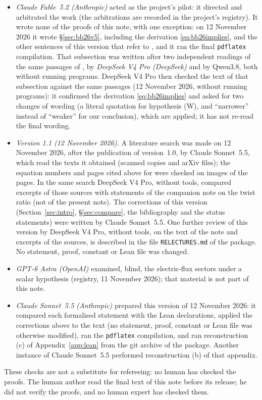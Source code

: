 \documentclass[11pt,a4paper]{article}
\theoremstyle{plain}
\theoremstyle{definition}
\theoremstyle{remark}
\numberwithin{equation}{section}
\begin{document}
\begin{itemize}
\item \emph{Claude Fable~5.2 (Anthropic)} acted as the project's pilot: it directed and arbitrated the work (the arbitrations are recorded in the project's registry). It wrote none of the proofs of this note, with one exception: on 12 November 2026 it wrote \S\ref{sec:bb26v5}, including the derivation \eqref{eq:bb26implies}, and the other sentences of this version that refer to \cite{BB26v5}, and it ran the final \texttt{pdflatex} compilation. That subsection was written after two independent readings of the same passages of \cite{BB26v5}, by \emph{DeepSeek V4 Pro (DeepSeek)} and by Qwen3.8, both without running programs. DeepSeek V4 Pro then checked the text of that subsection against the same passages (12 November 2026, without running programs): it confirmed the derivation \eqref{eq:bb26implies} and asked for two changes of wording (a literal quotation for hypothesis (W), and ``narrower'' instead of ``weaker'' for our conclusion), which are applied; it has not re-read the final wording.
\item \emph{Version 1.1 (12 November 2026).} A literature search was made on 12 November 2026, after the publication of version~1.0, by Claude Sonnet~5.5, which read the texts it obtained (scanned copies and arXiv files); the equation numbers and pages cited above for \cite{TY85,KT02,Kan} were checked on images of the pages. In the same search DeepSeek V4 Pro, without tools, compared excerpts of those sources with statements of the companion note on the twist ratio (not of the present note). The corrections of this version (Section~\ref{sec:intro}, \S\ref{sec:compare}, the bibliography and the status statements) were written by Claude Sonnet~5.5. One further review of this version by DeepSeek V4 Pro, without tools, on the text of the note and excerpts of the sources, is described in the file \texttt{RELECTURES.md} of the package. No statement, proof, constant or Lean file was changed.
\item \emph{GPT-6 Astra (OpenAI)} examined, blind, the electric-flux sectors under a scalar hypothesis (registry, 11 November 2026); that material is not part of this note.
\item \emph{Claude Sonnet~5.5 (Anthropic)} prepared this version of 12 November 2026: it compared each formalised statement with the Lean
declarations, applied the corrections above to the text (no statement, proof, constant or Lean file was otherwise modified), ran the
\texttt{pdflatex} compilation, and ran reconstruction (c) of Appendix~\ref{app:lean} from the git archive of the package. Another instance of Claude Sonnet~5.5 performed
reconstruction (b) of that appendix.
\end{itemize}
These checks are not a substitute for refereeing: no human has checked the proofs.
The human author read the final text of this note before its release; he did not verify the proofs, and no human expert has checked them.
\end{document}
